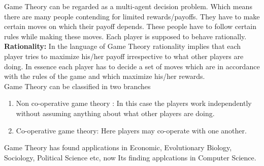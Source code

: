 Game Theory can be regarded as a multi-agent decision problem. Which means there are many people contending for limited rewards/payoffs. They have to make certain moves on which their payoff depends. These people have to follow certain rules  while making these moves.  Each player is supposed to behave rationally.\\
\textbf{Rationality:} In the language of Game Theory rationality implies that each player tries to maximize his/her payoff irrespective to what other players are doing.
In essence each player has to decide a set of moves which are in accordance with the rules of the game and which maximize his/her rewards.\\
Game Theory can be classified in two branches
\begin{enumerate}
    \item Non co-operative game theory :  In this case the players work independently without assuming anything about what other players are doing.
    \item Co-operative game theory: Here players may co-operate with one another.
\end{enumerate}
Game Theory has found applications in Economic, Evolutionary Biology, Sociology, Political Science etc, now Its finding applcations in Computer Science. 


